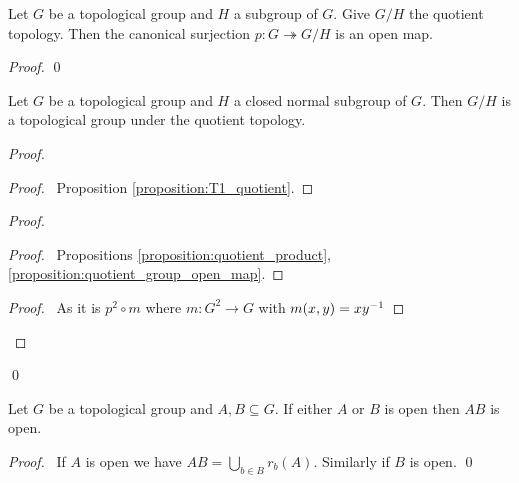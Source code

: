 \begin{proposition}
    \label{proposition:quotient_group_open_map}
    Let $G$ be a topological group and $H$ a subgroup of $G$. Give $G / H$ the
    quotient topology. Then the canonical surjection $p : G \twoheadrightarrow G / H$
    is an open map.
\end{proposition}

\begin{proof}
    \pf
    \qed
\end{proof}

\begin{proposition}
    Let $G$ be a topological group and $H$ a closed normal subgroup of $G$.
    Then $G / H$ is a topological group under the quotient topology.
\end{proposition}

\begin{proof}
    \pf
    \begin{proof}
        \pf\ Proposition \ref{proposition:T1_quotient}.
    \end{proof}
    \begin{proof}
        \begin{proof}
            \pf\ Propositions \ref{proposition:quotient_product}, \ref{proposition:quotient_group_open_map}.
        \end{proof}
        \begin{proof}
            \pf\ As it is $p^2 \circ m$ where $m : G^2 \rightarrow G$ with
            $m(x,y) = x{y}^{-1}$
        \end{proof}
    \end{proof}
    \qed
\end{proof}

\begin{lemma}
    \label{lemma:open_subset_mult}
    Let $G$ be a topological group and $A, B \subseteq G$. If either $A$ or $B$ is open then $AB$ is open.
\end{lemma}

\begin{proof}
    \pf\ If $A$ is open we have $AB = \bigcup_{b \in B} r_b(A)$. Similarly if $B$ is open. \qed
\end{proof}

